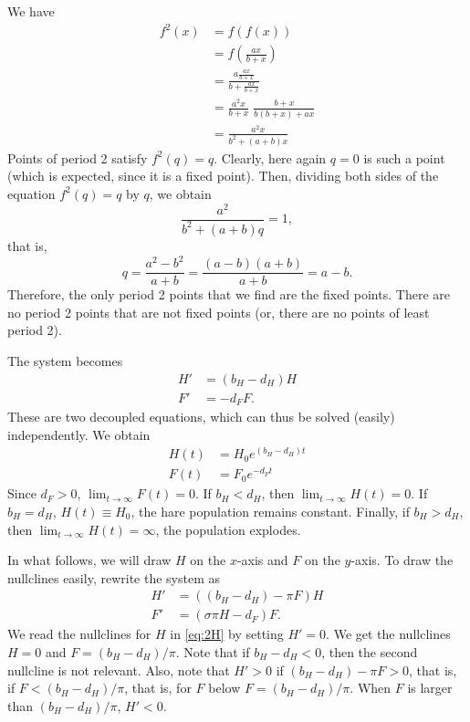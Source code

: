 \documentclass[12pt]{article}
\theoremstyle{plain}
\begin{document}
\vskip0.5cm
We have
\begin{align*}
f^2(x) &= f(f(x)) \\
&= f\left(\frac{ax}{b+x}\right) \\
&= \frac{a\frac{ax}{b+x}}{b+\frac{ax}{b+x}} \\
&= \frac{a^2x}{b+x}\;\frac{b+x}{b(b+x)+ax} \\
&= \frac{a^2x}{b^2+(a+b)x}
\end{align*}
Points of period 2 satisfy $f^2(q)=q$. Clearly, here again $q=0$ is such a point (which is expected, since it is a fixed point). Then, dividing both sides of the equation $f^2(q)=q$ by $q$, we obtain
\[
\frac{a^2}{b^2+(a+b)q}=1,
\]
that is,
\[
q=\frac{a^2-b^2}{a+b}=\frac{(a-b)(a+b)}{a+b}=a-b.
\]
Therefore, the only period 2 points that we find are the fixed points. There are no period 2 points that are not fixed points (or, there are no points of least period 2).

\vskip1cm
The system becomes
\begin{equation}\label{eq:3}
\begin{aligned}
H' &= (b_H-d_H)H \\
F' &= -d_FF.
\end{aligned}
\end{equation}
These are two decoupled equations, which can thus be solved (easily) independently. We obtain
\begin{align*}
H(t) &= H_0 e^{(b_H-d_H)t} \\
F(t) &= F_0 e^{-d_F t}
\end{align*}
Since $d_F>0$, $\lim_{t\to\infty}F(t)=0$. If $b_H<d_H$, then $\lim_{t\to\infty}H(t)=0$. If $b_H=d_H$, $H(t)\equiv H_0$, the hare population remains constant. Finally, if $b_H>d_H$, then $\lim_{t\to\infty}H(t)=\infty$, the population explodes.


In what follows, we will draw $H$ on the $x$-axis and $F$ on the $y$-axis.
To draw the nullclines easily, rewrite the system as
\begin{subequations}\label{eq:2}
\begin{align}
H' &= ((b_H-d_H) - \pi F)H \label{eq:2H}\\
F' &= (\sigma\pi H -d_F)F. \label{eq:2F}
\end{align}
\end{subequations}
We read the nullclines for $H$ in \eqref{eq:2H} by setting $H'=0$. We get the nullclines $H=0$ and $F=(b_H-d_H)/\pi$. 
Note that if $b_H-d_H<0$, then the second nullcline is not relevant.
Also, note that $H'>0$ if $(b_H-d_H)-\pi F>0$, that is, if $F<(b_H-d_H)/\pi$, that is, for $F$ below $F=(b_H-d_H)/\pi$. When $F$ is larger than $(b_H-d_H)/\pi$, $H'<0$.
\end{document}
